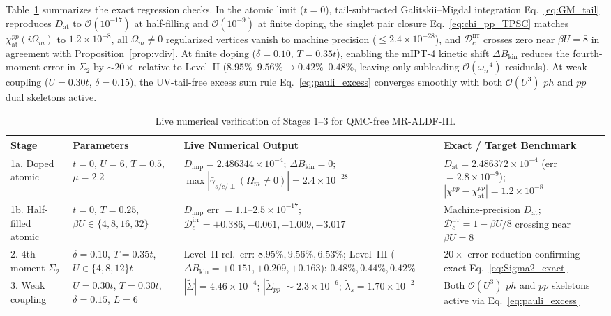 \documentclass[11pt,a4paper]{article}
\numberwithin{equation}{section}
\theoremstyle{plain}
\theoremstyle{definition}
\begin{document}
Table~\ref{tab:live_s13} summarizes the exact regression checks. In the atomic limit
($t = 0$), tail-subtracted Galitskii--Migdal integration Eq.~\eqref{eq:GM_tail}
reproduces $D_{\mathrm{at}}$ to $\mathcal{O}(10^{-17})$ at half-filling and
$\mathcal{O}(10^{-9})$ at finite doping, the singlet pair closure Eq.~\eqref{eq:chi_pp_TPSC}
matches $\chi_{\mathrm{at}}^{pp}(i\Omega_m)$ to $1.2\times 10^{-8}$, all $\Omega_m \neq 0$
regularized vertices vanish to machine precision ($\le 2.4\times 10^{-28}$), and
$\mathcal{D}_c^{\mathrm{irr}}$ crosses zero near $\beta U = 8$ in agreement with
Proposition~\ref{prop:vdiv}. At finite doping ($\delta = 0.10$, $T = 0.35t$), enabling the
mIPT-4 kinetic shift $\Delta B_{\mathrm{kin}}$ reduces the fourth-moment error in
$\Sigma_2$ by $\sim 20\times$ relative to Level~II ($8.95\%$--$9.56\% \to 0.42\%$--$0.48\%$,
leaving only subleading $\mathcal{O}(\omega_n^{-4})$ residuals). At weak coupling
($U = 0.30t$, $\delta = 0.15$), the UV-tail-free excess sum rule Eq.~\eqref{eq:pauli_excess}
converges smoothly with both $\mathcal{O}(U^3)$ $ph$ and $pp$ dual skeletons active.

\begin{table}[htbp]
\centering
\renewcommand{\arraystretch}{1.18}
\caption{Live numerical verification of Stages 1--3 for QMC-free MR-ALDF-III.}
\label{tab:live_s13}
\vspace{0.4em}
\small
\begin{tabular}{p{2.7cm}p{3.1cm}p{4.8cm}p{4.0cm}}
\toprule
\textbf{Stage} & \textbf{Parameters} & \textbf{Live Numerical Output} & \textbf{Exact / Target Benchmark} \\
\midrule
1a. Doped atomic
    & $t = 0$, $U = 6$, $T = 0.5$, $\mu = 2.2$
    & $D_{\mathrm{imp}} = 2.486344\times 10^{-4}$; $\Delta B_{\mathrm{kin}} = 0$; $\max|\bar{\gamma}_{s/c/\perp}(\Omega_m\neq 0)| = 2.4\times 10^{-28}$
    & $D_{\mathrm{at}} = 2.486372\times 10^{-4}$ (err $= 2.8\times 10^{-9}$); $|\chi^{pp} - \chi_{\mathrm{at}}^{pp}| = 1.2\times 10^{-8}$ \\
1b. Half-filled atomic
    & $t = 0$, $T = 0.25$, $\beta U \in \{4, 8, 16, 32\}$
    & $D_{\mathrm{imp}}$ err $= 1.1\text{--}2.5\times 10^{-17}$; $\mathcal{D}_c^{\mathrm{irr}} = +0.386, -0.061, -1.009, -3.017$
    & Machine-precision $D_{\mathrm{at}}$; $\mathcal{D}_c^{\mathrm{irr}} = 1 - \beta U/8$ crossing near $\beta U = 8$ \\
2. 4th moment $\Sigma_2$
    & $\delta = 0.10$, $T = 0.35t$, $U \in \{4, 8, 12\}t$
    & Level~II rel.\ err: $8.95\%, 9.56\%, 6.53\%$; Level~III ($\Delta B_{\mathrm{kin}} = +0.151, +0.209, +0.163$): $0.48\%, 0.44\%, 0.42\%$
    & $20\times$ error reduction confirming exact Eq.~\eqref{eq:Sigma2_exact} \\
3. Weak coupling
    & $U = 0.30t$, $T = 0.30t$, $\delta = 0.15$, $L = 6$
    & $|\tilde{\Sigma}| = 4.46\times 10^{-4}$; $|\tilde{\Sigma}_{pp}| \sim 2.3\times 10^{-6}$; $\tilde{\lambda}_s = 1.70\times 10^{-2}$
    & Both $\mathcal{O}(U^3)$ $ph$ and $pp$ skeletons active via Eq.~\eqref{eq:pauli_excess} \\
\bottomrule
\end{tabular}
\end{table}
\end{document}
